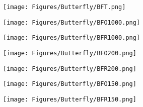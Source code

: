 \begin{figure*}[htbp]
    \centering
    \begin{minipage}{0.29\textwidth}
        \centering
        \texttt{[image: Figures/Butterfly/BFT.png]}
    \end{minipage}
    
    \vspace{0.1em} %
    \begin{minipage}{0.29\textwidth}
        \centering
        \texttt{[image: Figures/Butterfly/BFO1000.png]}
    \end{minipage}
    \hspace{13em}
     \begin{minipage}{0.29\textwidth}
        \centering      \texttt{[image: Figures/Butterfly/BFR1000.png]}
    \end{minipage}
    
    \vspace{0.1em}
    
    \begin{minipage}{0.29\textwidth}
        \centering
        \texttt{[image: Figures/Butterfly/BFO200.png]}
    \end{minipage}
    \hspace{13em}
    \begin{minipage}{0.29\textwidth}
        \centering
        \texttt{[image: Figures/Butterfly/BFR200.png]}
    \end{minipage}

     \vspace{0.1em} 
    
    \begin{minipage}{0.29\textwidth}
        \centering
        \texttt{[image: Figures/Butterfly/BFO150.png]}
    \end{minipage}  
    \hspace{13em} %
    \begin{minipage}{0.29\textwidth}
        \centering
        \texttt{[image: Figures/Butterfly/BFR150.png]}
    \end{minipage}
    

\end{figure*}
